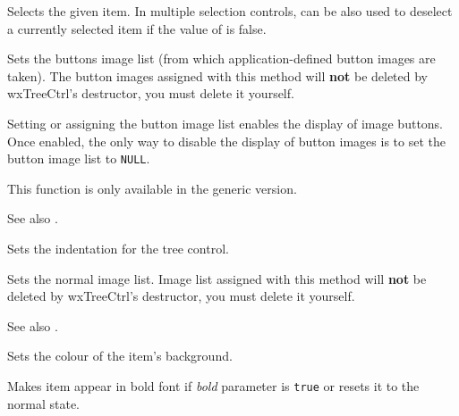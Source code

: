 Selects the given item. In multiple selection controls, can be also used to
deselect a currently selected item if the value of  is false.


\label{wxtreectrlsetbuttonsimagelist}


Sets the buttons image list (from which application-defined button images are taken).
The button images assigned with this method will
{\bf not} be deleted by wxTreeCtrl's destructor, you must delete it yourself.

Setting or assigning the button image list enables the display of image buttons.
Once enabled, the only way to disable the display of button images is to set
the button image list to {\tt NULL}.

This function is only available in the generic version.

See also .


\label{wxtreectrlsetindent}


Sets the indentation for the tree control.


\label{wxtreectrlsetimagelist}


Sets the normal image list. Image list assigned with this method will
{\bf not} be deleted by wxTreeCtrl's destructor, you must delete it yourself.

See also .



\label{wxtreectrlsetitembackgroundcolour}


Sets the colour of the item's background.


\label{wxtreectrlsetitembold}


Makes item appear in bold font if {\it bold} parameter is {\tt true} or resets it to
the normal state.

